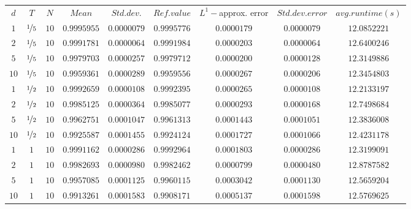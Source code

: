 \begin{tabular}{ccccccccc}
$d$ & $T$ & $N$ & $Mean$ & $Std. dev.$ & $Ref. value$ & $L^1-$approx. error & $Std. dev. error$ & $avg. runtime (s)$\\
$1$ & $\nicefrac{1}{5}$ & $10$ & $0.9995955$ & $0.0000079$ & $0.9995776$ & $0.0000179$ & $0.0000079$ & $12.0852221$\\
$2$ & $\nicefrac{1}{5}$ & $10$ & $0.9991781$ & $0.0000064$ & $0.9991984$ & $0.0000203$ & $0.0000064$ & $12.6400246$\\
$5$ & $\nicefrac{1}{5}$ & $10$ & $0.9979703$ & $0.0000257$ & $0.9979712$ & $0.0000200$ & $0.0000128$ & $12.3149886$\\
$10$ & $\nicefrac{1}{5}$ & $10$ & $0.9959361$ & $0.0000289$ & $0.9959556$ & $0.0000267$ & $0.0000206$ & $12.3454803$\\
$1$ & $\nicefrac{1}{2}$ & $10$ & $0.9992659$ & $0.0000108$ & $0.9992395$ & $0.0000265$ & $0.0000108$ & $12.2133197$\\
$2$ & $\nicefrac{1}{2}$ & $10$ & $0.9985125$ & $0.0000364$ & $0.9985077$ & $0.0000293$ & $0.0000168$ & $12.7498684$\\
$5$ & $\nicefrac{1}{2}$ & $10$ & $0.9962751$ & $0.0001047$ & $0.9961313$ & $0.0001443$ & $0.0001051$ & $12.3836008$\\
$10$ & $\nicefrac{1}{2}$ & $10$ & $0.9925587$ & $0.0001455$ & $0.9924124$ & $0.0001727$ & $0.0001066$ & $12.4231178$\\
$1$ & $1$ & $10$ & $0.9991162$ & $0.0000286$ & $0.9992964$ & $0.0001803$ & $0.0000286$ & $12.3199091$\\
$2$ & $1$ & $10$ & $0.9982693$ & $0.0000980$ & $0.9982462$ & $0.0000799$ & $0.0000480$ & $12.8787582$\\
$5$ & $1$ & $10$ & $0.9957085$ & $0.0001125$ & $0.9960115$ & $0.0003042$ & $0.0001130$ & $12.5659204$\\
$10$ & $1$ & $10$ & $0.9913261$ & $0.0001583$ & $0.9908171$ & $0.0005137$ & $0.0001598$ & $12.5769625$\\
\end{tabular}
